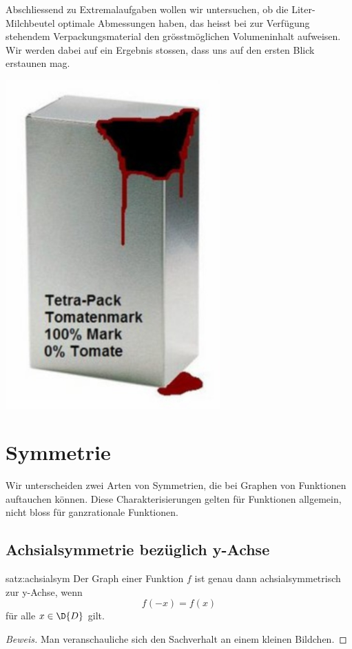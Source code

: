\documentclass[%
11pt,%
twoside,%
titlepage,%
german,%
headsepline%
]{scrartcl}
\begin{document}
\begin{ueb}
Abschliessend
zu Extremalaufgaben wollen wir untersuchen, ob die Liter-Milchbeutel optimale Abmessungen haben, das heisst bei zur Verf\"ugung stehendem Verpackungsmaterial den gr\"osstm\"oglichen Volumeninhalt aufweisen. Wir werden dabei auf ein Ergebnis stossen, dass uns auf den ersten Blick erstaunen mag.

\begin{center}
\includegraphics[width=0.618\textwidth]{pictures/Tetrapack}
\end{center}
\end{ueb}

\clearpage

\section{Symmetrie}
Wir unterscheiden zwei Arten von Symmetrien, die bei Graphen von Funktionen auftauchen k\"onnen. Diese Charakterisierungen gelten f\"ur Funktionen allgemein, nicht bloss f\"ur ganzrationale Funktionen.
\subsection{Achsialsymmetrie bez\"uglich y-Achse}
\begin{csatz}{satz:achsialsym}
Der Graph einer Funktion $f$ ist genau dann achsialsymmetrisch zur y-Achse, wenn
$$f(-x) = f(x)$$
f\"ur alle $x\in\D{D}$ gilt.
\end{csatz}
\begin{proof}[Beweis]
Man veranschauliche sich den Sachverhalt an einem kleinen Bildchen.
\end{proof}
\end{document}
